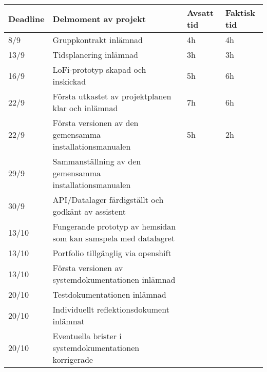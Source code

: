 \documentclass{mall}
\begin{document}
\begin{table}[h]
\begin{tabularx}{\textwidth}{|l|X|l|l|}
\hline
Deadline & Delmoment av projekt                                                                            & Avsatt tid & Faktisk tid \\ \hline
8/9      & Gruppkontrakt inlämnad                                                               & 4h            & 4h              \\ \hline
13/9     & Tidsplanering inlämnad                                                               & 3h            & 3h            \\ \hline
16/9     & LoFi-prototyp skapad och inskickad                                                   & 5h          & 6h             \\ \hline
22/9     & Första utkastet av projektplanen klar och inlämnad                                   & 7h           & 6h             \\ \hline
22/9     & Första versionen av den gemensamma installationsmanualen                             & 5h           & 2h            \\ \hline
29/9     & Sammanställning av den gemensamma installationsmanualen                             &            &              \\ \hline
30/9     & API/Datalager färdigställt och godkänt av assistent                                  &            &              \\ \hline
13/10    & Fungerande prototyp av hemsidan som kan samspela med datalagret &            &              \\ \hline
13/10    & Portfolio tillgänglig via openshift                                                  &            &              \\ \hline
13/10    & Första versionen av systemdokumentationen inlämnad                                   &            &              \\ \hline
20/10    & Testdokumentationen inlämnad                                                         &            &              \\ \hline
20/10    & Individuellt reflektionsdokument inlämnat                                            &            &              \\ \hline
20/10    & Eventuella brister i systemdokumentationen korrigerade                               &            &              \\ \hline
\end{tabularx}
\end{table}
\end{document}
